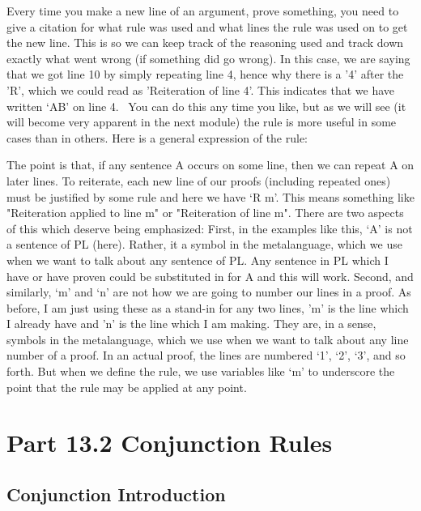 \begin{fitchproof}
\ellipsesline
{} 
\end{fitchproof}

Every time you make a new line of an argument, prove something, you need to give a citation for what rule was used and what lines the rule was used on to get the new line. This is so we can keep track of the reasoning used and track down exactly what went wrong (if something did go wrong). In this case, we are saying that we got line 10 by simply repeating line 4, hence why there is a '4' after the 'R', which we could read as 'Reiteration of line 4'. This indicates that we have written ‘A\eand B’ on line 4.  You can do this any time you like, but as we will see (it will become very apparent in the next module) the rule is more useful in some cases than in others. Here is a general expression of the rule:

The point is that, if any sentence A occurs on some line, then we can repeat A on later lines. To reiterate, each new line of our proofs (including repeated ones) must be justified by some rule and here we have ‘R m’. This means something like "Reiteration applied to line m" or "Reiteration of line m". There are two aspects of this which deserve being emphasized: First, in the examples like this, ‘A’ is not a sentence of PL (here). Rather, it a symbol in the metalanguage, which we use when we want to talk about any sentence of PL. Any sentence in PL which I have or have proven could be substituted in for A and this will work. Second, and similarly, ‘m’ and ‘n’ are not how we are going to number our lines in a proof. As before, I am just using these as a stand-in for any two lines, 'm' is the line which I already have and 'n' is the line which I am making. They are, in a sense, symbols in the metalanguage, which we use when we want to talk about any line number of a proof. In an actual proof, the lines are numbered ‘1’, ‘2’, ‘3’, and so forth. But when we define the rule, we use variables like ‘m’ to underscore the point that the rule may be applied at any point.
\section{Part 13.2 Conjunction Rules}
\subsection{Conjunction Introduction}

